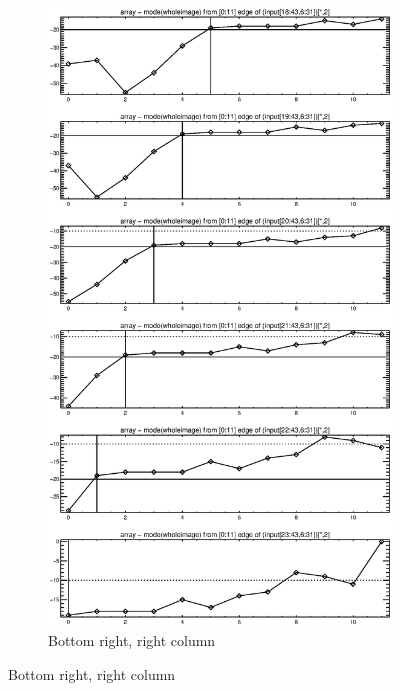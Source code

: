 \documentclass[10pt]{article}
\begin{document}
\begin{figure}[!h]
    \centering 
    \hspace{-1.0in}
    \begin{subfigure}[b]{.4\linewidth}
        \centering
        \includegraphics[width=1.4\textwidth]{../plots_tables_images/botright2.eps} 
        \caption{Bottom right, right column}
    \end{subfigure}
    \hspace{1.0in}

\end{figure}
\end{document}
